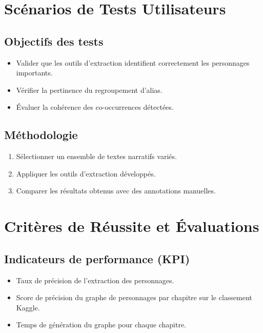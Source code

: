 \documentclass[12pt,a4paper]{article}
\begin{document}
\section{Scénarios de Tests Utilisateurs}

\subsection{Objectifs des tests}

\begin{itemize}
    \item Valider que les outils d'extraction identifient correctement les personnages importants.
    \item Vérifier la pertinence du regroupement d'alias.
    \item Évaluer la cohérence des co-occurrences détectées.
\end{itemize}

\subsection{Méthodologie}

\begin{enumerate}
    \item Sélectionner un ensemble de textes narratifs variés.
    \item Appliquer les outils d'extraction développés.
    \item Comparer les résultats obtenus avec des annotations manuelles.
\end{enumerate}

\section{Critères de Réussite et Évaluations}

\subsection{Indicateurs de performance (KPI)}

\begin{itemize}
    \item Taux de précision de l'extraction des personnages.
    \item Score de précision du graphe de personnages par chapitre sur le classement Kaggle.
    \item Temps de génération du graphe pour chaque chapitre.
\end{itemize}
\end{document}
